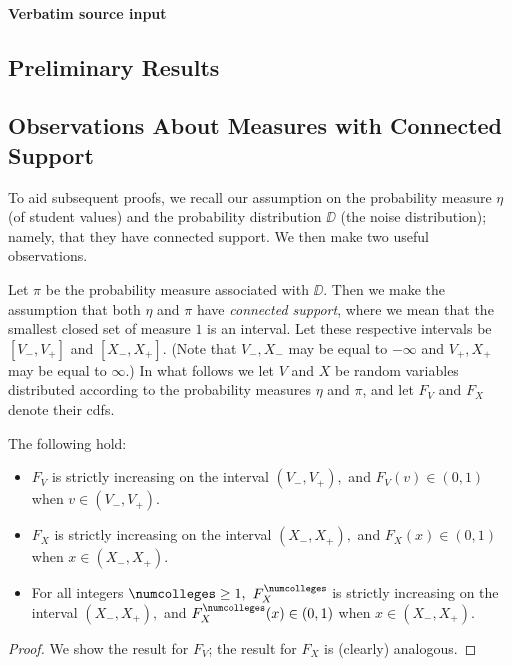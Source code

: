 \documentclass[10pt]{article}
\begin{document}
\paragraph{Verbatim source input}
\begin{ReviewVerbatim}
\section{Preliminary Results}

\subsection{Observations About Measures with Connected Support}

To aid subsequent proofs, we recall our assumption on the probability measure $\eta$ (of student values) and the probability distribution $\DD$ (the noise distribution); namely, that they have connected support. We then make two useful observations.

Let $\pi$ be the probability measure associated with $\DD$. Then we make the assumption that both $\eta$ and $\pi$ have \textit{connected support}, where we mean that the smallest closed set of measure $1$ is an interval. Let these respective intervals be $[V_-, V_+]$ and $[X_-, X_+]$. (Note that $V_-, X_-$ may be equal to $-\infty$ and $V_+, X_+$ may be equal to $\infty$.) In what follows we let $V$ and $X$ be random variables distributed according to the probability measures $\eta$ and $\pi$, and let $F_V$ and $F_X$ denote their cdfs.

\begin{proposition}\label{prop:cdf-increasing}
The following hold:
\begin{itemize}
    \item[(i)] $F_V$ is strictly increasing on the interval $(V_-, V_+),$ and $F_V(v)\in (0,1)$ when $v\in (V_-, V_+).$
    \item[(ii)] $F_X$ is strictly increasing on the interval $(X_-, X_+),$ and $F_X(x)\in (0,1)$ when $x\in (X_-, X_+).$
    \item[(iii)] For all integers $\numcolleges\ge 1,$ $F_X^\numcolleges$ is strictly increasing on the interval $(X_-, X_+),$ and $F_X^\numcolleges(x)\in (0,1)$ when $x\in (X_-, X_+).$
\end{itemize}
\end{proposition}

\begin{proof}
We show the result for $F_V$; the result for $F_X$ is (clearly) analogous.


\end{proof}
\end{ReviewVerbatim}
\end{document}
